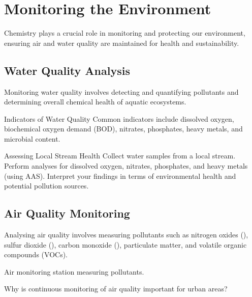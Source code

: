 \FloatBarrier

\section{Monitoring the Environment}
\FloatBarrier
\FloatBarrier
\FloatBarrier

Chemistry plays a crucial role in monitoring and protecting our environment, ensuring air and water quality are maintained for health and sustainability.

\subsection{Water Quality Analysis}
\FloatBarrier
\FloatBarrier
\FloatBarrier

Monitoring water quality involves detecting and quantifying pollutants and determining overall chemical health of aquatic ecosystems.

\begin{keyconcept}{Indicators of Water Quality}
Common indicators include dissolved oxygen, biochemical oxygen demand (BOD), nitrates, phosphates, heavy metals, and microbial content.
\end{keyconcept}

\begin{investigation}{Assessing Local Stream Health}
Collect water samples from a local stream. Perform analyses for dissolved oxygen, nitrates, phosphates, and heavy metals (using AAS). Interpret your findings in terms of environmental health and potential pollution sources.
\end{investigation}

\subsection{Air Quality Monitoring}
\FloatBarrier
\FloatBarrier
\FloatBarrier

Analysing air quality involves measuring pollutants such as nitrogen oxides (), sulfur dioxide (), carbon monoxide (), particulate matter, and volatile organic compounds (VOCs).

\begin{marginfigure}[0pt][0pt][0pt]
\caption{Air monitoring station measuring pollutants.}
\label{fig:air-monitoring}
\end{marginfigure}

\begin{stopandthink}
Why is continuous monitoring of air quality important for urban areas?
\end{stopandthink}

